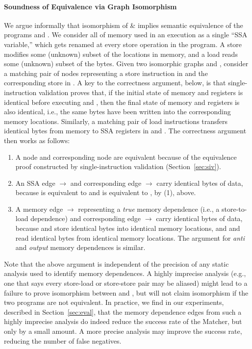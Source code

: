 \paragraph{Soundness of Equivalence via Graph Isomorphism}
%
We argue informally that isomorphism of \GN \& \GNP implies semantic equivalence of
the programs  and \Tp. We consider all of memory used in an execution as a single
``SSA variable,'' which gets renamed at every store operation in the program.  A store
modifies some (unknown) subset of the locations in memory, and a load reads some
(unknown) subset of the bytes.  Given two isomorphic graphs \GN and \GNP, consider a 
matching pair of nodes representing a store instruction  in  and the 
corresponding store \Sp in \Tp.  A key to the correctness argument, below, is that
single-instruction validation proves that, if the initial state of memory and registers
is identical before executing  and \Sp, then the final state of memory and registers
is also identical, i.e., the same bytes have been written into the corresponding memory
locations.  Similarly, a matching pair of load instructions transfers identical bytes
from memory to SSA registers in  and \Tp.
%
The correctness argument then works as follows:
%
\begin{enumerate}
  \item A node  and corresponding node \Np are equivalent because of the 
  equivalence proof constructed by single-instruction validation (Section~\ref{sec:siv}).
  \item An SSA edge  $\rightarrow$  and corresponding edge 
  \Ap $\rightarrow$ \Bp carry identical bytes of data, because  is equivalent
  to \Ap and  is equivalent to \Bp, by (1), above.
  \item A memory edge  $\rightarrow$  representing a \emph{true} memory
  dependence (i.e., a store-to-load dependence) and corresponding edge \Sp $\rightarrow$
  \Lp carry identical bytes of data, because  and \Sp store identical bytes into
  identical memory locations, and  and \Lp read identical bytes from identical
  memory locations.  The argument for \emph{anti} and \emph{output} memory dependences
  is similar.
\end{enumerate}

Note that the above argument is independent of the precision of any static analysis
used to identify memory dependences.  A highly imprecise analysis (e.g., one that
says every store-load or store-store pair may be aliased) might lead to a failure to
prove isomorphism between  and \Tp, but will not claim isomorphism if the two
programs are not equivalent.  In practice, we find in our experiments, described in 
Section~\ref{sec:eval}, that the memory dependence edges from such a highly imprecise
analysis do indeed reduce the success rate of the Matcher, but only by a small amount.
A more precise analysis may improve the success rate, reducing the number of false
negatives.

